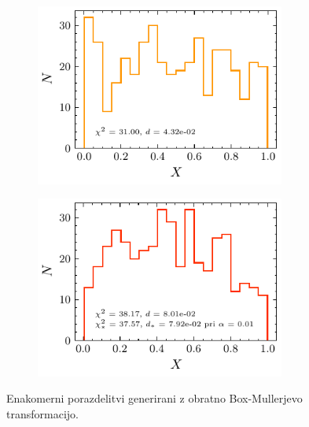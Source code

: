 \documentclass[11pt, oneside]{article}
\theoremstyle{definition}
\begin{document}
\begin{figure}[h!]
    \centering
    \begin{subfigure}[b]{0.49\textwidth}
        \centering
        \includegraphics[width=0.9\textwidth]{box_muller_uniform_0.pdf}
    \end{subfigure}
    \hfill
    \begin{subfigure}[b]{0.49\textwidth}
        \centering
        \includegraphics[width=0.9\textwidth]{box_muller_uniform_1.pdf}
    \end{subfigure}
    \caption{Enakomerni porazdelitvi generirani z obratno Box-Mullerjevo transformacijo.}
    \label{fig: box_muller}
\end{figure}

\newpage
\end{document}
